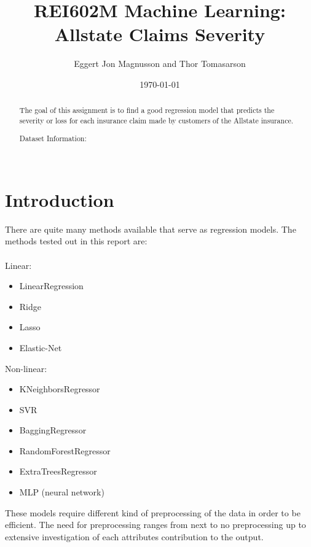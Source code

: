 \documentclass[a4paper]{article}
\title{REI602M Machine Learning: Allstate Claims Severity}
\author{Eggert Jon Magnusson and Thor Tomasarson}
\date{\today}
\begin{document}
\maketitle

\begin{abstract}
The goal of this assignment is to find a good regression model that predicts the severity or loss for each insurance claim made by customers of the Allstate insurance.

\begin{displayquote}
Dataset Information: \\\\
\end{displayquote}

\end{abstract}

\section{Introduction}

There are quite many methods available that serve as regression models. The methods tested out in this report are:\\\\
Linear:
\begin{itemize}
    \item LinearRegression
    \item Ridge
    \item Lasso
    \item Elastic-Net
\end{itemize}
Non-linear:
\begin{itemize}
    \item KNeighborsRegressor
    \item SVR
    \item BaggingRegressor
    \item RandomForestRegressor
    \item ExtraTreesRegressor
    \item MLP (neural network)
\end{itemize}
These models require different kind of preprocessing of the data in order to be efficient. The need for preprocessing ranges from next to no preprocessing up to extensive investigation of each attributes contribution to the output.
\end{document}
